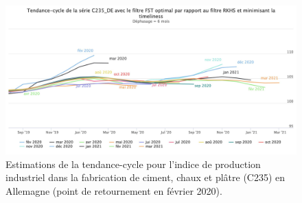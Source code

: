 \documentclass[
  11pt,
  french,
  a4paper]{article}
\newcommand\1{\mathds{1}}
\begin{document}
\begin{figure}[H]

{\centering \includegraphics[width=0.9\linewidth,]{img/simulations/c235_de_fst_rkhs_timeliness} 

}

\caption[Estimations de la tendance-cycle pour l'indice de production industriel dans la fabrication de ciment, chaux et plâtre (C235) en Allemagne (point de retournement en février 2020)]{Estimations de la tendance-cycle pour l'indice de production industriel dans la fabrication de ciment, chaux et plâtre (C235) en Allemagne (point de retournement en février 2020).}\label{fig:c235dep4}

\footnotesize
\normalsize\end{figure}
\end{document}
